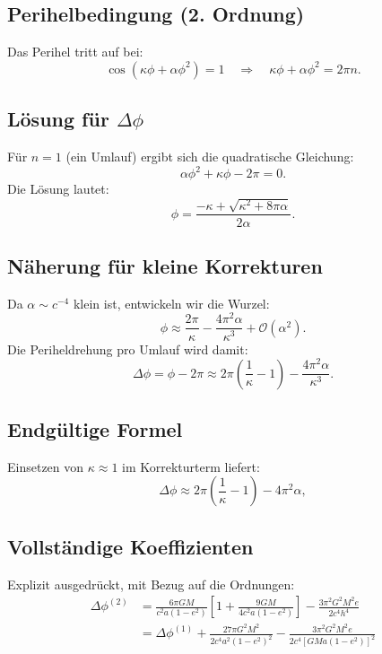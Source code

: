 \subsection{Perihelbedingung (2. Ordnung)}
Das Perihel tritt auf bei:
\begin{equation}
\cos\left(\kappa\phi + \alpha\phi^2\right) = 1 \quad \Rightarrow \quad \kappa\phi + \alpha\phi^2 = 2\pi n.
\end{equation}

\subsection{Lösung für $\Delta\phi$}
Für $n=1$ (ein Umlauf) ergibt sich die quadratische Gleichung:
\begin{equation}
\alpha\phi^2 + \kappa\phi - 2\pi = 0.
\end{equation}
Die Lösung lautet:
\begin{equation}
\phi = \frac{-\kappa + \sqrt{\kappa^2 + 8\pi\alpha}}{2\alpha}.
\end{equation}

\subsection{Näherung für kleine Korrekturen}
Da $\alpha \sim c^{-4}$ klein ist, entwickeln wir die Wurzel:
\begin{equation}
\phi \approx \frac{2\pi}{\kappa} - \frac{4\pi^2\alpha}{\kappa^3} + \mathcal{O}(\alpha^2).
\end{equation}
Die Periheldrehung pro Umlauf wird damit:
\begin{equation}
\Delta\phi = \phi - 2\pi \approx 2\pi\left(\frac{1}{\kappa} - 1\right) - \frac{4\pi^2\alpha}{\kappa^3}.
\end{equation}

\subsection{Endgültige Formel}
Einsetzen von $\kappa \approx 1$ im Korrekturterm liefert:
\begin{equation}
\boxed{
\Delta\phi \approx 2\pi\left(\frac{1}{\kappa} - 1\right) - 4\pi^2\alpha
},
\end{equation}

\subsection{Vollständige Koeffizienten}
Explizit ausgedrückt, mit Bezug auf die Ordnungen:
\begin{align*}
\Delta\phi^{(2)} &= \frac{6\pi GM}{c^2 a(1 - e^2)} \left[1 + \frac{9GM}{4c^2 a(1 - e^2)}\right] - \frac{3\pi^2 G^2 M^2 e}{2c^4 h^4} \\
&= \Delta\phi^{(1)} + \frac{27\pi G^2 M^2}{2c^4 a^2 (1 - e^2)^2} - \frac{3\pi^2 G^2 M^2 e}{2c^4 [GMa(1 - e^2)]^2}
\end{align*}
